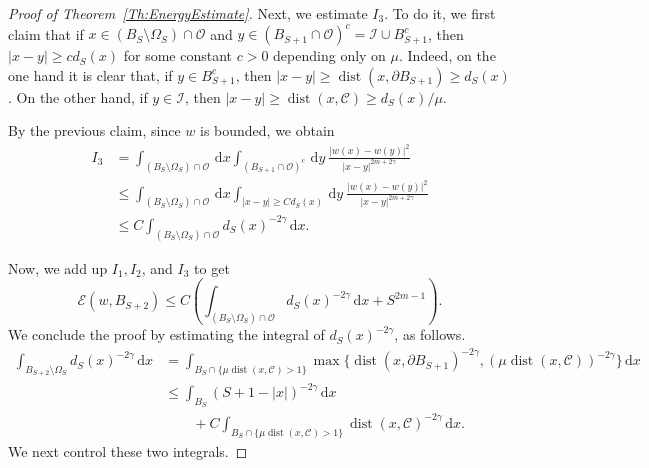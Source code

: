 \documentclass[12pt,reqno]{amsart}
\theoremstyle{definition}
\theoremstyle{remark}
\newcommand{\ccal}{\mathscr{C}}
\newcommand{\ecal}{\mathcal{E}}
\newcommand{\ical}{\mathcal{I}}
\newcommand{\ocal}{\mathcal{O}}
\newcommand{\s}{\gamma}
\renewcommand{\d}{\,\mathrm{d}} %
\DeclareMathOperator{\dist}{dist}
\numberwithin{equation}{section}
\begin{document}
\begin{proof}[Proof of Theorem~\ref{Th:EnergyEstimate}]
		Next, we estimate $I_3$. To do it, we first claim that if $x\in (B_S\setminus \Omega_S) \cap \ocal$ and $y\in (B_{S+1}\cap \ocal)^c = \ical \cup B_{S+1}^c$, then $|x-y|\geq c d_S(x)$ for some constant $c>0$ depending only on $\mu$. Indeed, on the one hand it is clear that, if $y\in B_{S+1}^c$, then $|x-y|\geq \dist(x,\partial B_{S+1})\geq d_S(x)$. On the other hand, if $y\in \ical$, then $|x-y|\geq \dist(x,\ccal) \geq  d_S(x) / \mu$.
		
		By the previous claim, since $w$ is bounded, we obtain
		\begin{align*}
		I_3 &= \int_{(B_S\setminus \Omega_S)\cap \ocal} \d x \int_{(B_{S+1}\cap \ocal)^c} \d y \  \frac{|w(x)-w(y)|^2}{|x-y|^{2m+2\s}} \\
		&\leq \int_{(B_S\setminus \Omega_S)\cap \ocal} \d x \int_{|x-y|\geq C d_S(x)} \d y \ \frac{|w(x)-w(y)|^2}{|x-y|^{2m+2\s}} \\
		&\leq C \int_{(B_S\setminus \Omega_S)\cap \ocal}  d_S(x)^{-2\s} \d x .
		\end{align*}
		
		Now, we add up $I_1, I_2$, and $I_3$ to get
		\begin{equation}
		\label{Eq:EnergyEstimateProofLastEstimate}
		\ecal(w,B_{S+2}) \leq C \left( \int_{(B_S\setminus \Omega_S)\cap \ocal}  d_S(x)^{-2\s} \d x + S^{2m-1}\right).
		\end{equation}
		We conclude the proof by estimating the integral of $d_S(x)^{-2\s}$, as follows.
		\begin{equation}
		\label{Eq:EnergyEstimatedS}
		\begin{split}
		\int_{B_{S+2}\setminus \Omega_S} d_S(x)^{-2\s} \d x &= \int_{B_{S}\cap \{\mu \dist(x,\ccal)>1\}} \!\!\!\! \max\{\dist(x,\partial B_{S+1})^{-2\s}, (\mu\dist(x,\ccal))^{-2\s}\} \d x \\
		& \leq \int_{B_S} \left( S+1-|x| \right)^{-2\s} \d x \\
		& \quad \quad + C \int_{B_{S}\cap \{\mu \dist(x,\ccal)>1\}} \dist(x,\ccal)^{-2\s} \d x.
		\end{split}
		\end{equation}
		We next control these two integrals.
		

\end{proof}
\end{document}
